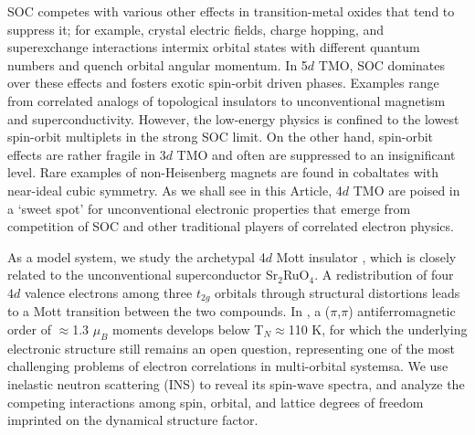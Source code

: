 \noindent
SOC competes with various other effects in transition-metal oxides that tend to suppress it; for example, crystal electric fields, charge hopping, and superexchange interactions intermix orbital states with different quantum numbers and quench orbital angular momentum. In 5$d$ TMO, SOC dominates over these effects and fosters exotic spin-orbit driven phases. Examples range from correlated analogs of topological insulators\cite{Witczak_Krempa_2014} to unconventional magnetism\cite{Jackeli_2009}  and superconductivity\cite{Kim_2014}. However, the low-energy physics is confined to the lowest spin-orbit multiplets in the strong SOC limit. On the other hand, spin-orbit effects are rather fragile in 3$d$ TMO and often are suppressed to an insignificant level. Rare examples of non-Heisenberg magnets are found in cobaltates with near-ideal cubic symmetry. As we shall see in this Article, 4$d$ TMO are poised in a `sweet spot' for unconventional electronic properties that emerge from competition of SOC and other traditional players of correlated electron physics. 
  
As a model system, we study the archetypal 4$d$ Mott insulator \CROns\cite{Nakatsuji_1997}, which is closely related to the unconventional superconductor Sr$_2$RuO$_4$\cite{Maeno_1994}. A redistribution of four $4d$ valence electrons among three $t_{2g}$ orbitals through structural distortions leads to a Mott transition between the two compounds. In \CROns, a ($\pi$,$\pi$) antiferromagnetic order of $\approx$1.3 $\mu_B$ moments develops below T$_N$$\approx$110 K, for which the underlying electronic structure still remains an open question, representing one of the most challenging problems of electron correlations in multi-orbital systemsa\cite{Anisimov_2002}. We use  inelastic neutron scattering (INS) to reveal its spin-wave spectra, and analyze the competing interactions among spin, orbital, and lattice degrees of freedom imprinted on the dynamical structure factor.  

  
  
  
  